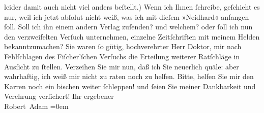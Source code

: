 \begin{ledgroupsized}[t]{13cm}
               leider damit auch nicht viel anders beſtellt.)\pend
           \pstart
           Wenn ich Ihnen ſchreibe, geſchieht es nur, weil ich jetzt abſolut nicht weiß, was ich
               mit dieſem »Neidhard« anfangen ſoll. Soll ich
               ihn einem andern Verlag zuſenden? und welchem? oder ſoll ich nun den verzweifelten
               Verſuch unternehmen, einzelne Zeitſchriften mit meinem Helden bekanntzumachen?\pend
           \pstart
           Sie waren ſo gütig, hochverehrter Herr Doktor, mir nach Fehlſchlagen des Fiſcher’ſchen Verſuchs die Erteilung weiterer
               Ratſchläge in Ausſicht zu ſtellen. Verzeihen Sie mir nun, daß ich Sie neuerlich
               quäle: aber wahrhaftig, ich weiß mir nicht zu raten noch zu helfen.\pend
           \pstart
           Bitte, helfen Sie mir den Karren noch ein bischen weiter ſchleppen! und ſeien Sie
               meiner Dankbarkeit und {\pb}Verehrung verſichert!\pend
           \pstart
           Ihr ergebener{\\[\baselineskip]}\spacefill\mbox{Robert Adam}\pend
           \leftskip=0em{}
         
         \endnumbering{}\end{ledgroupsized}  \newcommand{\dateiname}{L02009}\newcommand{\titel}{Robert Adam an Arthur Schnitzler, 9. 2. 1911}\newcommand{\editorInnen}{Martin Anton Müller und Gerd-Hermann Susen}
      